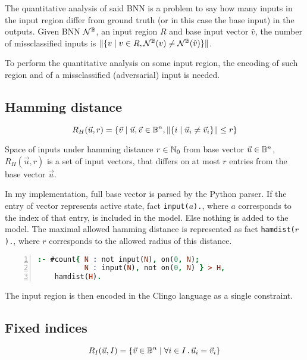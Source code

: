 \documentclass[
    digital,
    color,
    oneside,
    sansbold,
    lot,
    nolof
]{fithesis}
\begin{document}
The quantitative analysis of said BNN is a problem to say how many inputs
in the input region differ from ground truth (or in this case the base input)
in the outputs. Given BNN $\mathcal{N}^{\mathbb{B}}$, an input region $R$ and base input vector $\hat v$, the number of
missclassified inputs is $\|\{v\mid v\in R, \mathcal{N}^{\mathbb{B}}(v) \neq \mathcal{N}^{\mathbb{B}}(\hat v)\}\|$.

To perform the quantitative analysis on some input region, the encoding of such
region and of a missclassified (adversarial) input is needed.

\subsection{Hamming distance}

\begin{equation*}
    R_H(\vec u, r) = \{\vec v \mid \vec u, \vec v \in \mathbb{B}^n,
                       \|\{i \mid \vec u_i \neq \vec v_i\}\| \leq r\}
\end{equation*}

Space of inputs under hamming distance $r\in\mathbb{N}_0$ from base vector
$\vec u\in\mathbb{B}^n$,
$R_H(\vec u, r)$ is a set of input vectors, that differs on at most $r$ entries
from the base vector $\vec u$.

In my implementation, full base vector is parsed by the Python parser.
If the entry of vector represents active state, fact \texttt{input($a$).},
where $a$ corresponds to the index of that entry,
is included in the model. Else nothing is added to the model. The maximal
allowed hamming distance is represented as fact \texttt{hamdist($r$).},
where $r$ corresponds to the allowed radius of this distance.

\begin{lstlisting}[language=prolog, numbers=left, countblanklines=false]
% base vector is at most hamdist from on
:- #count{ N : not input(N), on(0, N);
           N : input(N), not on(0, N) } > H,
    hamdist(H).
\end{lstlisting}
The input region is then encoded in the Clingo language as a single constraint.

\subsection{Fixed indices}

\begin{equation*}
    R_I(\vec u, I) = \{\vec v\in \mathbb{B}^n \mid \forall i\in I \,.\, \vec u_i = \vec v_i\}
\end{equation*}
\end{document}
